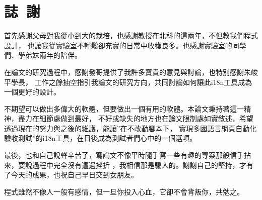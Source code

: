 \chapter*{誌~謝~}

首先感謝父母對我從小到大的栽培，也感謝教授在北科的這兩年，不但教我們程式設計，
也讓我從實驗室不輕鬆卻充實的日常中收穫良多。也感謝實驗室的同學們、學弟妹兩年的陪伴。

在論文的研究過程中，感謝發哥提供了我許多寶貴的意見與討論，也特別感謝朱峻平學長，
工作之餘抽空指引我論文的研究方向，共同討論如何讓此i18n工具成為一個更好的設計。

不期望可以做出多偉大的軟體，但要做出一個有用的軟體。本論文秉持著這一精神，盡力在細節處做到最好，
不好或缺失的地方也在論文限制處如實敘述，希望透過現在的努力與之後的維護，能讓”在不改動腳本下，
實現多國語言網頁自動化驗收測試”的i18n工具，在日後成為測試者們心中的一個選項。

最後，也和自己說聲辛苦了，寫論文不像平時隨手寫一些有趣的專案那般信手拈來，要說過程中完全沒有遭遇挫折
，我相信那是騙人的。謝謝自己的堅持，才有了今天的成果，也祝自己早日交到女朋友。

程式雖然不像人一般有感情，但一旦你投入心血，它卻不會背叛你，共勉之。

